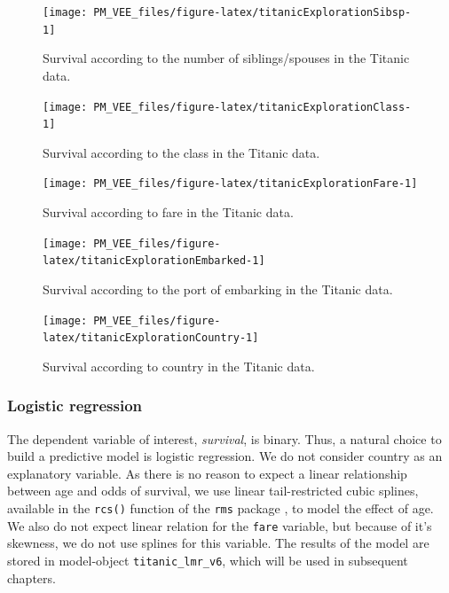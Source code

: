 \documentclass[12pt,]{krantz}
\theoremstyle{definition}
\theoremstyle{definition}
\theoremstyle{definition}
\theoremstyle{remark}
\begin{document}
\begin{figure}

{\centering \texttt{[image: PM\_VEE\_files/figure-latex/titanicExplorationSibsp-1]} 

}

\caption{Survival according to the number of siblings/spouses in the Titanic data.}\label{fig:titanicExplorationSibsp}
\end{figure}
\begin{figure}

{\centering \texttt{[image: PM\_VEE\_files/figure-latex/titanicExplorationClass-1]} 

}

\caption{Survival according to the class in the Titanic data.}\label{fig:titanicExplorationClass}
\end{figure}

\begin{figure}

{\centering \texttt{[image: PM\_VEE\_files/figure-latex/titanicExplorationFare-1]} 

}

\caption{Survival according to fare in the Titanic data.}\label{fig:titanicExplorationFare}
\end{figure}

\begin{figure}

{\centering \texttt{[image: PM\_VEE\_files/figure-latex/titanicExplorationEmbarked-1]} 

}

\caption{Survival according to the port of embarking in the Titanic data.}\label{fig:titanicExplorationEmbarked}
\end{figure}

\begin{figure}

{\centering \texttt{[image: PM\_VEE\_files/figure-latex/titanicExplorationCountry-1]} 

}

\caption{Survival according to country in the Titanic data.}\label{fig:titanicExplorationCountry}
\end{figure}

\hypertarget{model-titanic-lmr}{%
\subsubsection{Logistic regression}\label{model-titanic-lmr}}

The dependent variable of interest, \emph{survival}, is binary. Thus, a
natural choice to build a predictive model is logistic regression. We do
not consider country as an explanatory variable. As there is no reason
to expect a linear relationship between age and odds of survival, we use
linear tail-restricted cubic splines, available in the \texttt{rcs()}
function of the \texttt{rms} package \citep{rms}, to model the effect of
age. We also do not expect linear relation for the \texttt{fare}
variable, but because of it's skewness, we do not use splines for this
variable. The results of the model are stored in model-object
\texttt{titanic\_lmr\_v6}, which will be used in subsequent chapters.
\end{document}
